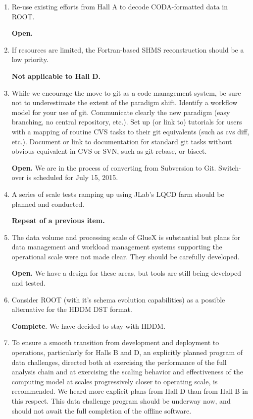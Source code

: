 \documentclass[12pt]{article}
\begin{document}
\begin{enumerate}
  {\bf Complete.} The framework has been stressed both in the sense
  that (a) a large fraction of the collaboration have been using it
  for data reconstruction and analysis and (b) its large-scale
  performance has been tested in data challenges.
  
\item Re-use existing efforts from Hall A to decode CODA-formatted
  data in ROOT.

  {\bf Open.}

\item If resources are limited, the Fortran-based SHMS reconstruction
  should be a low priority.

  {\bf Not applicable to Hall D.}

\item While we encourage the move to git as a code management system,
  be sure not to underestimate the extent of the paradigm
  shift. Identify a workflow model for your use of git. Communicate
  clearly the new paradigm (easy branching, no central repository,
  etc.). Set up (or link to) tutorials for users with a mapping of
  routine CVS tasks to their git equivalents (such as cvs diff,
  etc.). Document or link to documentation for standard git tasks
  without obvious equivalent in CVS or SVN, such as git rebase, or
  bisect.

  {\bf Open.} We are in the process of converting from Subversion to
  Git. Switch-over is scheduled for July 15, 2015.

\item A series of scale tests ramping up using JLab's LQCD farm should
  be planned and conducted.

  {\bf Repeat of a previous item.} 

\item The data volume and processing scale of GlueX is substantial but
  plans for data management and workload management systems supporting
  the operational scale were not made clear. They should be carefully
  developed.

  {\bf Open.} We have a design for these areas, but tools are still
  being developed and tested.

\item Consider ROOT (with it's schema evolution capabilities) as a
  possible alternative for the HDDM DST format.

  {\bf Complete}. We have decided to stay with HDDM.

\item To ensure a smooth transition from development and deployment to
  operations, particularly for Halls B and D, an explicitly planned
  program of data challenges, directed both at exercising the
  performance of the full analysis chain and at exercising the scaling
  behavior and effectiveness of the computing model at scales
  progressively closer to operating scale, is recommended. We heard
  more explicit plans from Hall D than from Hall B in this
  respect. This data challenge program should be underway now, and
  should not await the full completion of the offline software.


\end{enumerate}
\end{document}

